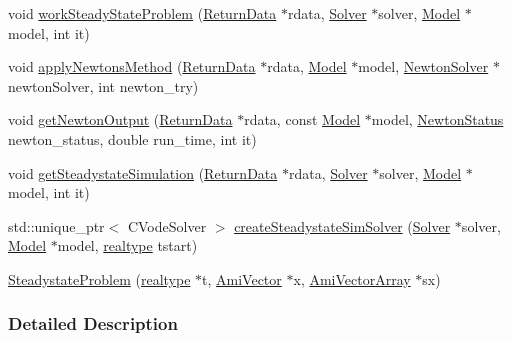 \begin{DoxyCompactItemize}
\item 
void \mbox{\hyperlink{classamici_1_1_steadystate_problem_aa2630b3401b8f0a50bf50c73d4f39790}{work\+Steady\+State\+Problem}} (\mbox{\hyperlink{classamici_1_1_return_data}{Return\+Data}} $\ast$rdata, \mbox{\hyperlink{classamici_1_1_solver}{Solver}} $\ast$solver, \mbox{\hyperlink{classamici_1_1_model}{Model}} $\ast$model, int it)
\item 
void \mbox{\hyperlink{classamici_1_1_steadystate_problem_a1c33ff72fd843a1a51cd93448e3e5a77}{apply\+Newtons\+Method}} (\mbox{\hyperlink{classamici_1_1_return_data}{Return\+Data}} $\ast$rdata, \mbox{\hyperlink{classamici_1_1_model}{Model}} $\ast$model, \mbox{\hyperlink{classamici_1_1_newton_solver}{Newton\+Solver}} $\ast$newton\+Solver, int newton\+\_\+try)
\item 
void \mbox{\hyperlink{classamici_1_1_steadystate_problem_adb3f762f7b6e1e084a8fa1a0a155e4e1}{get\+Newton\+Output}} (\mbox{\hyperlink{classamici_1_1_return_data}{Return\+Data}} $\ast$rdata, const \mbox{\hyperlink{classamici_1_1_model}{Model}} $\ast$model, \mbox{\hyperlink{namespaceamici_a3fb34b6904b8b45827b51132977431da}{Newton\+Status}} newton\+\_\+status, double run\+\_\+time, int it)
\item 
void \mbox{\hyperlink{classamici_1_1_steadystate_problem_a7567ea97f4d840e7df61340b5129f4cd}{get\+Steadystate\+Simulation}} (\mbox{\hyperlink{classamici_1_1_return_data}{Return\+Data}} $\ast$rdata, \mbox{\hyperlink{classamici_1_1_solver}{Solver}} $\ast$solver, \mbox{\hyperlink{classamici_1_1_model}{Model}} $\ast$model, int it)
\item 
std\+::unique\+\_\+ptr$<$ C\+Vode\+Solver $>$ \mbox{\hyperlink{classamici_1_1_steadystate_problem_ad219bc64b739a9ff5d52555b0433577b}{create\+Steadystate\+Sim\+Solver}} (\mbox{\hyperlink{classamici_1_1_solver}{Solver}} $\ast$solver, \mbox{\hyperlink{classamici_1_1_model}{Model}} $\ast$model, \mbox{\hyperlink{namespaceamici_a1bdce28051d6a53868f7ccbf5f2c14a3}{realtype}} tstart)
\item 
\mbox{\hyperlink{classamici_1_1_steadystate_problem_a215594a7e2834ad307f3ef163b512c02}{Steadystate\+Problem}} (\mbox{\hyperlink{namespaceamici_a1bdce28051d6a53868f7ccbf5f2c14a3}{realtype}} $\ast$t, \mbox{\hyperlink{classamici_1_1_ami_vector}{Ami\+Vector}} $\ast$x, \mbox{\hyperlink{classamici_1_1_ami_vector_array}{Ami\+Vector\+Array}} $\ast$sx)
\end{DoxyCompactItemize}


\subsubsection{Detailed Description}


